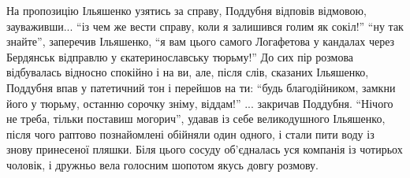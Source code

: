 \documentclass[a4paper,20pt]{report}
\begin{document}
На пропозицію Ільяшенко узятись за справу, Поддубня відповів відмовою, зауваживши...
``із чем же вести справу, коли я залишився голим як сокіл!'' ``ну так знайте'', заперечив Ільяшенко,
``я вам цього самого Логафетова у кандалах через Бердянськ відправлю у єкатеринославську тюрьму!''
До сих пір розмова відбувалась відносно спокійно і на ви, але, після слів, сказаних Ільяшенко, Поддубня 
впав у патетичний тон і перейшов на ти:
``будь благодійником, замкни його у тюрьму, останню сорочку зніму, віддам!'' ... закричав Поддубня. ``Нічого не треба,
тільки поставиш могорич'', удавав із себе великодушного Ільяшенко,
після чого раптово познайомлені обійняли один одного, і стали пити воду із знову принесеної пляшки. Біля цього
сосуду об'єдналась уся компанія із чотирьох чоловік, і дружньо вела голосним шопотом якусь довгу розмову.
\end{document}
